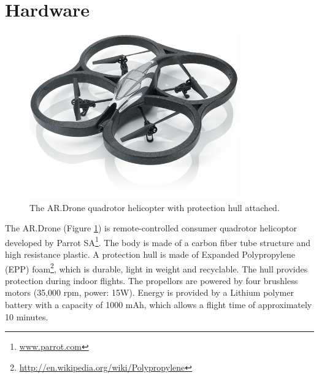 \section{Hardware}
\begin{figure}[htb]
\centering
\includegraphics[width=9cm]{images/ardrone.jpg}
\caption{The AR.Drone quadrotor helicopter with protection hull attached.}
\label{fig:ardrone_hull}
\end{figure}
The AR.Drone (Figure \ref{fig:ardrone_hull}) is remote-controlled consumer quadrotor helicoptor developed by Parrot SA\footnote{\url{www.parrot.com}}.
The body is made of a carbon fiber tube structure and high resistance 
plastic.
A protection hull is made of Expanded Polypropylene (EPP) foam\footnote{\url{http://en.wikipedia.org/wiki/Polypropylene}}, which is durable, light in weight and recyclable.
The hull provides protection during indoor flights.
The propellors are powered by four brushless motors (35,000 rpm, power: 15W).
Energy is provided by a Lithium polymer battery with a capacity of 1000 mAh, which allows a flight time of approximately 10 minutes.

